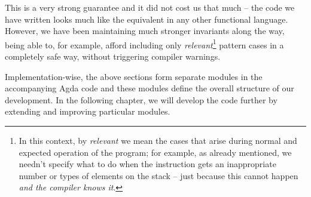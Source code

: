 This is a very strong guarantee and it did not cost us that much -- the code we
have written looks much like the equivalent in any other functional language.
However, we have been maintaining much stronger invariants along the way, being
able to, for example, afford including only \emph{relevant}\footnote{In this
  context, by \emph{relevant} we mean the cases that arise during normal and
  expected operation of the program; for example, as already mentioned, we
needn't specify what to do when the instruction  gets an
inappropriate number or types of elements on the stack -- just because this
cannot happen \emph{and the compiler knows it}.} pattern cases in a completely
safe way, without triggering compiler warnings.

Implementation-wise, the above sections form separate modules in the
accompanying Agda code and these modules define the overall structure of our
development. In the following chapter, we will develop
the code further by extending and improving particular modules.



